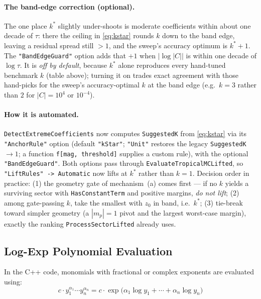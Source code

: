 \documentclass[11pt,a4paper]{article}
\begin{document}
\paragraph{The band-edge correction (optional).} The one place $k^{*}$ slightly
under-shoots is moderate coefficients within about one decade of $\tau$: there the
ceiling in \eqref{eq:kstar} rounds $k$ down to the band edge, leaving a residual
spread still $>1$, and the sweep's accuracy optimum is $k^{*}{+}1$. The
\texttt{"BandEdgeGuard"} option adds that $+1$ when $|\log|C||$ is within one
decade of $\log\tau$. It is \emph{off by default}, because $k^{*}$ alone
reproduces every hand-tuned benchmark $k$ (table above); turning it on trades
exact agreement with those hand-picks for the sweep's accuracy-optimal $k$ at the
band edge (e.g.\ $k{=}3$ rather than $2$ for $|C|=10^4$ or $10^{-4}$).

\paragraph{How it is automated.} \texttt{DetectExtremeCoefficients} now computes
\texttt{SuggestedK} from \eqref{eq:kstar} via its \texttt{"AnchorRule"} option
(default \texttt{"kStar"}; \texttt{"Unit"} restores the legacy
\texttt{SuggestedK}~$\to 1$; a function \texttt{f[mag,\,threshold]} supplies a
custom rule), with the optional \texttt{"BandEdgeGuard"}. Both options pass
through \texttt{EvaluateTropicalMCLifted}, so \texttt{"LiftRules" -> Automatic}
now lifts at $k^{*}$ rather than $k=1$. Decision order in practice: (1) the
geometry gate of mechanism~(a) comes first --- if no $k$ yields a surviving
sector with \texttt{HasConstantTerm} and positive margins, \emph{do not lift};
(2) among gate-passing $k$, take the smallest with $z_0$ in band, i.e.\ $k^{*}$;
(3) tie-break toward simpler geometry (a $|m_p|=1$ pivot and the largest
worst-case margin), exactly the ranking \texttt{ProcessSectorLifted} already uses.

\subsection{Log-Exp Polynomial Evaluation}

In the C++ code, monomials with fractional or complex exponents are evaluated using:
\begin{equation}
c \cdot y_1^{\alpha_1} \cdots y_n^{\alpha_n} = c \cdot \exp\!\bigl(\alpha_1 \log y_1 + \cdots + \alpha_n \log y_n\bigr)
\end{equation}
\end{document}
